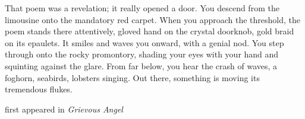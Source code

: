 That poem was a revelation; it really opened a door. You descend from
the limousine onto the mandatory red carpet. When you approach the
threshold, the poem stands there attentively, gloved hand on the crystal
doorknob, gold braid on its epaulets. It smiles and waves you onward,
with a genial nod. You step through onto the rocky promontory, shading
your eyes with your hand and squinting against the glare. From far
below, you hear the crash of waves, a foghorn, seabirds, lobsters
singing. Out there, something is moving its tremendous flukes.

first appeared in \emph{Grievous Angel}
